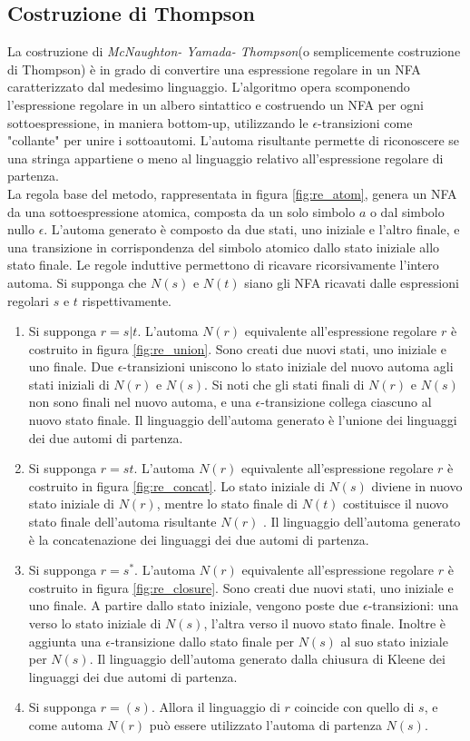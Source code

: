 \subsection{Costruzione di Thompson} \label{thompson}
La costruzione di \emph{McNaughton- Yamada- Thompson}(o semplicemente costruzione di Thompson) è in grado di convertire una espressione regolare in un NFA caratterizzato dal medesimo linguaggio. L'algoritmo opera scomponendo l'espressione regolare in un albero sintattico e costruendo un NFA per ogni sottoespressione, in maniera bottom-up, utilizzando le $\epsilon$-transizioni come "collante" per unire i sottoautomi. L'automa risultante permette di riconoscere se una stringa appartiene o meno al linguaggio relativo all'espressione regolare di partenza.\\
La regola base del metodo, rappresentata in figura \ref{fig:re_atom}, genera un NFA da una sottoespressione atomica, composta da un solo simbolo $a$ o dal simbolo nullo $\epsilon$. L'automa generato è composto da due stati, uno iniziale e l'altro finale, e una transizione in corrispondenza del simbolo atomico dallo stato iniziale allo stato finale.
Le regole induttive permettono di ricavare ricorsivamente l'intero automa.
Si supponga che $N(s)$ e $N(t)$ siano gli NFA ricavati dalle espressioni regolari $s$ e $t$ rispettivamente.
\begin{enumerate}
\item Si supponga $r = s|t$. L'automa $N(r)$ equivalente all'espressione regolare $r$ è costruito in figura \ref{fig:re_union}. Sono creati due nuovi stati, uno iniziale e uno finale. Due $\epsilon$-transizioni uniscono lo stato iniziale del nuovo automa agli stati iniziali di $N(r)$ e $N(s)$. Si noti che gli stati finali di $N(r)$ e $N(s)$ non sono finali nel nuovo automa, e una $\epsilon$-transizione collega ciascuno al nuovo stato finale. Il linguaggio dell'automa generato è l'unione dei linguaggi dei due automi di partenza.
\item Si supponga $r = st$. L'automa $N(r)$ equivalente all'espressione regolare $r$ è costruito in figura \ref{fig:re_concat}. Lo stato iniziale di $N(s)$ diviene in nuovo stato iniziale di $N(r)$, mentre lo stato finale di $N(t)$ costituisce il nuovo stato finale dell'automa risultante $N(r)$ . Il linguaggio dell'automa generato è la concatenazione dei linguaggi dei due automi di partenza.
\item Si supponga $r = s^*$. L'automa $N(r)$ equivalente all'espressione regolare $r$ è costruito in figura \ref{fig:re_closure}. Sono creati due nuovi stati, uno iniziale e uno finale. A partire dallo stato iniziale, vengono poste due $\epsilon$-transizioni: una verso lo stato iniziale di $N(s)$, l'altra verso il nuovo stato finale. Inoltre è aggiunta una $\epsilon$-transizione dallo stato finale per $N(s)$ al suo stato iniziale per $N(s)$. Il linguaggio dell'automa generato dalla chiusura di Kleene dei linguaggi dei due automi di partenza.
\item Si supponga $r = (s)$. Allora il linguaggio di $r$ coincide con quello di $s$, e come automa $N(r)$ può essere utilizzato l'automa di partenza $N(s)$.
\end{enumerate} 


